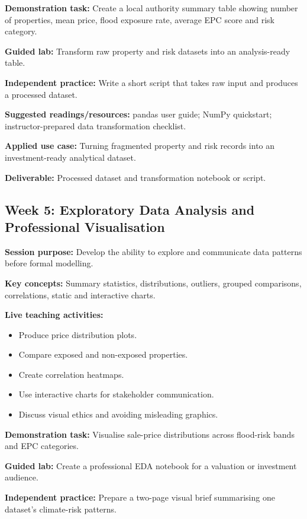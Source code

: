 \documentclass[
  a4paper,
]{article}
\providecommand{\tightlist}{%
  \setlength{\itemsep}{0pt}\setlength{\parskip}{0pt}}
\begin{document}
\textbf{Demonstration task:} Create a local authority summary table
showing number of properties, mean price, flood exposure rate, average
EPC score and risk category.

\textbf{Guided lab:} Transform raw property and risk datasets into an
analysis-ready table.

\textbf{Independent practice:} Write a short script that takes raw input
and produces a processed dataset.

\textbf{Suggested readings/resources:} pandas user guide; NumPy
quickstart; instructor-prepared data transformation checklist.

\textbf{Applied use case:} Turning fragmented property and risk records
into an investment-ready analytical dataset.

\textbf{Deliverable:} Processed dataset and transformation notebook or
script.

\subsection{Week 5: Exploratory Data Analysis and Professional
Visualisation}\label{week-5-exploratory-data-analysis-and-professional-visualisation}

\textbf{Session purpose:} Develop the ability to explore and communicate
data patterns before formal modelling.

\textbf{Key concepts:} Summary statistics, distributions, outliers,
grouped comparisons, correlations, static and interactive charts.

\textbf{Live teaching activities:}

\begin{itemize}
\tightlist
\item
  Produce price distribution plots.
\item
  Compare exposed and non-exposed properties.
\item
  Create correlation heatmaps.
\item
  Use interactive charts for stakeholder communication.
\item
  Discuss visual ethics and avoiding misleading graphics.
\end{itemize}

\textbf{Demonstration task:} Visualise sale-price distributions across
flood-risk bands and EPC categories.

\textbf{Guided lab:} Create a professional EDA notebook for a valuation
or investment audience.

\textbf{Independent practice:} Prepare a two-page visual brief
summarising one dataset's climate-risk patterns.
\end{document}

